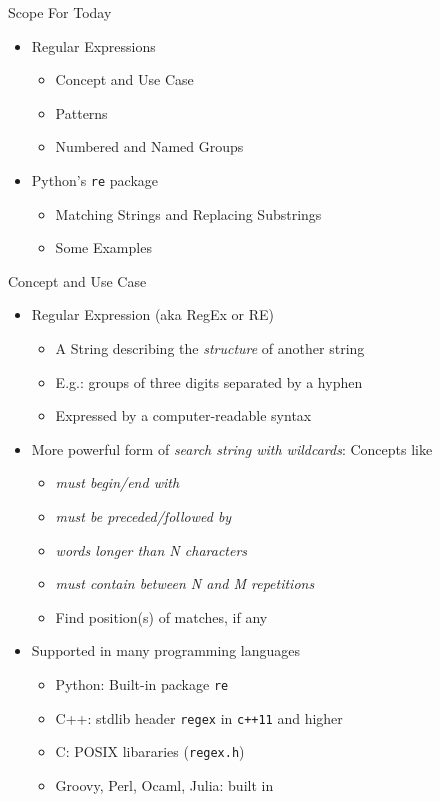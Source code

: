 
\begin{frame}{Scope For Today}
%
\begin{itemize}
\item Regular Expressions
	\begin{itemize}
	\item Concept and Use Case
	\item Patterns
	\item Numbered and Named Groups
	\end{itemize}
\item Python's \texttt{re} package
	\begin{itemize}
	\item Matching Strings and Replacing Substrings
	\item Some Examples
	\end{itemize}
\end{itemize}
%
\end{frame}


\begin{frame}{Concept and Use Case}
%
\begin{itemize}
\item Regular Expression (aka RegEx or RE)
	\begin{itemize}
	\item A String describing the \emph{structure} of another string
	\item E.\;g.: groups of three digits separated by a hyphen
	\item Expressed by a computer-readable syntax
	\end{itemize}
\pause
\item More powerful form of \emph{search string with wildcards}: Concepts like
	\begin{itemize}
	\item \emph{must begin/end with}
	\item \emph{must be preceded/followed by}
	\item \emph{words longer than N characters}
	\item \emph{must contain between N and M repetitions}
	\item Find position(s) of matches, if any
	\end{itemize}
\pause
\item Supported in many programming languages
	\begin{itemize}
	\item Python: Built-in package \texttt{re}
	\item C++: stdlib header \texttt{regex} in \texttt{c++11} and higher
	\item C: POSIX libararies (\texttt{regex.h})
	\item Groovy, Perl, Ocaml, Julia: built in
	\end{itemize}
\end{itemize}
%
\end{frame}

